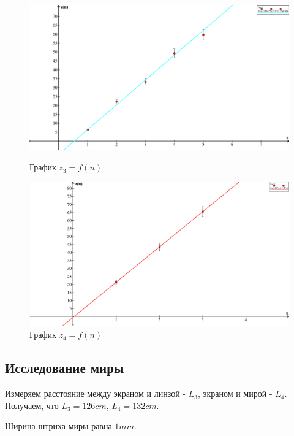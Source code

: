 \documentclass[15pt,a5paper,reqno]{article}
\begin{document}
  \begin{figure}[h!]
    \begin{minipage}[b]{0.8\textwidth}
        \includegraphics[width=\textwidth]{pics/lab_436_3.png}
        \caption{График $z_3 = f(n)$}
    \end{minipage}
  
    \begin{minipage}[b]{0.8\textwidth}
        \includegraphics[width=\textwidth]{pics/lab_436_4.png}
        \caption{График $z_4 = f(n)$}
    \end{minipage}
  \end{figure}



\subsection{Исследование миры}

Измеряем расстояние между экраном и линзой - $L_3$, экраном и мирой - $L_4$.
Получаем, что $L_3 = 126 cm$, $L_4 = 132 cm$.

Ширина штриха миры равна $1 mm$.
\end{document}
